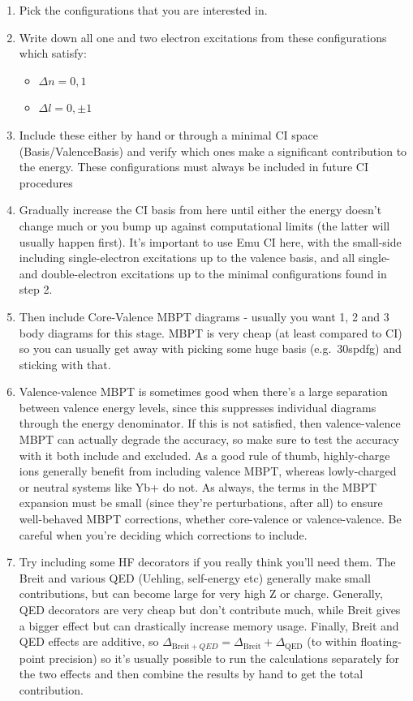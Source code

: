 \documentclass{report}
\begin{document}
\begin{enumerate}
\item
  Pick the configurations that you are interested in.
\item
  Write down all one and two electron excitations from these
  configurations which satisfy:

  \begin{itemize}
  \item
    $\Delta n = 0, 1$
  \item
    $\Delta l = 0, \pm 1$
  \end{itemize}
\item
  Include these either by hand or through a minimal CI space
  (Basis/ValenceBasis) and verify which ones make a significant
  contribution to the energy. These configurations must always be
  included in future CI procedures
\item
  Gradually increase the CI basis from here until either the energy
  doesn't change much or you bump up against computational limits (the latter will usually happen
  first). It's important to use Emu CI here, with the small-side including single-electron excitations
  up to the valence basis, and all single- and double-electron excitations up to the minimal
  configurations found in step 2.
\item
  Then include Core-Valence MBPT diagrams - usually you want 1, 2 and 3
  body diagrams for this stage. MBPT is very cheap (at least compared to
  CI) so you can usually get away with picking some huge basis
  (e.g.~30spdfg) and sticking with that.
\item
  Valence-valence MBPT is sometimes good when there's a large separation
  between valence energy levels, since this suppresses individual
  diagrams through the energy denominator. If this is not satisfied,
  then valence-valence MBPT can actually degrade the accuracy, so make
  sure to test the accuracy with it both include and excluded. As a good
  rule of thumb, highly-charge ions generally benefit from including
  valence MBPT, whereas lowly-charged or neutral systems like Yb+ do
  not. As always, the terms in the MBPT expansion must be small (since they're perturbations, after all)
  to ensure well-behaved MBPT corrections, whether core-valence or valence-valence. Be careful when
  you're deciding which corrections to include.
\item
  Try including some HF decorators if you really think you'll need them.
  The Breit and various QED (Uehling, self-energy etc) generally make
  small contributions, but can become large for very high Z or charge.
  Generally, QED decorators are very cheap but don't contribute much,
  while Breit gives a bigger effect but can drastically increase memory
  usage. Finally, Breit and QED effects are additive, so $\Delta_{\mathrm{Breit} +
  QED} = \Delta_{\mathrm{Breit}} + \Delta_{\mathrm{QED}}$ (to within floating-point precision) so it's
  usually possible to run the calculations separately for the two effects and then combine the results 
  by hand to get the total contribution.
\end{enumerate}
\end{document}

